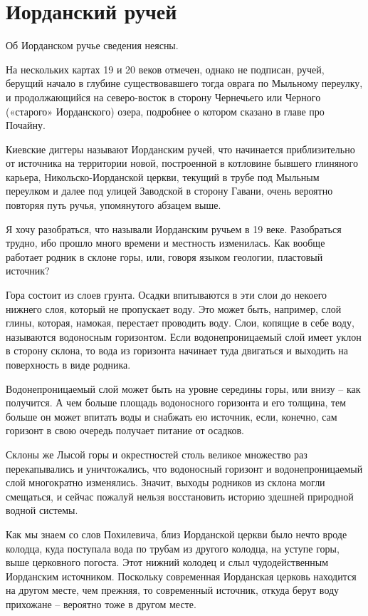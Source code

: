 \chapter {Иорданский ручей}

Об Иорданском ручье сведения неясны. 

На нескольких картах 19 и 20 веков отмечен, однако не подписан, ручей, берущий начало в глубине существовавшего тогда оврага по Мыльному переулку, и продолжающийся на северо-восток в сторону Чернечьего или Черного («старого» Иорданского) озера, подробнее о котором сказано в главе про Почайну.

Киевские диггеры называют Иорданским ручей, что начинается приблизительно от источника на территории новой, построенной в котловине бывшего глиняного карьера, Никольско-Иорданской церкви, текущий в трубе под Мыльным переулком и далее под улицей Заводской в сторону Гавани, очень вероятно повторяя путь ручья, упомянутого абзацем выше.

Я хочу разобраться, что называли Иорданским ручьем в 19 веке. Разобраться трудно, ибо прошло много времени и местность изменилась. Как вообще работает родник в склоне горы, или, говоря языком геологии, пластовый источник? 

Гора состоит из слоев грунта. Осадки впитываются в эти слои до некоего нижнего слоя, который не пропускает воду. Это может быть, например, слой глины, которая, намокая, перестает проводить воду. Слои, копящие в себе воду, называются водоносным горизонтом. Если водонепроницаемый слой имеет уклон в сторону склона, то вода из горизонта начинает туда двигаться и выходить на поверхность в виде родника.

Водонепроницаемый слой может быть на уровне середины горы, или внизу – как получится. А чем больше площадь водоносного горизонта и его толщина, тем больше он может впитать воды и снабжать ею источник, если, конечно, сам горизонт в свою очередь получает питание от осадков.

Склоны же Лысой горы и окрестностей столь великое множество раз перекапывались и уничтожались, что водоносный горизонт и водонепроницаемый слой многократно изменялись. Значит, выходы родников из склона могли смещаться, и сейчас пожалуй нельзя восстановить историю здешней природной водной системы.
 
Как мы знаем со слов Похилевича, близ Иорданской церкви было нечто вроде колодца, куда поступала вода по трубам из другого колодца, на уступе горы, выше церковного погоста. Этот нижний колодец и слыл чудодейственным Иорданским источником. Поскольку современная Иорданская церковь находится на другом месте, чем прежняя, то современный источник, откуда берут воду прихожане – вероятно тоже в другом месте.

